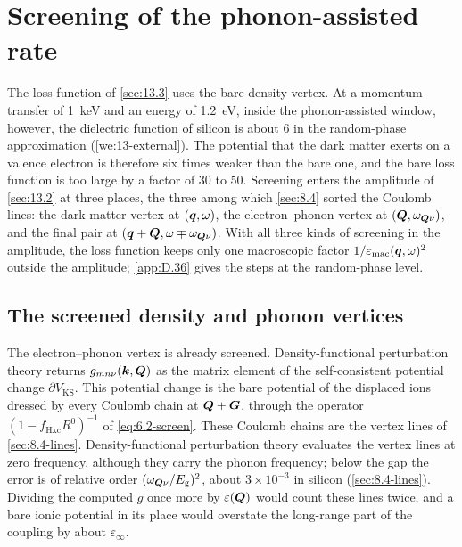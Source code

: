 \section{Screening of the phonon-assisted rate}\label{sec:13.4}

The loss function of \cref{sec:13.3} uses the bare density vertex. At a momentum transfer of \SI{1}{keV} and an energy of \SI{1.2}{eV}, inside the phonon-assisted window, however, the dielectric function of silicon is about 6 in the random-phase approximation (\cref{we:13-external}). The potential that the dark matter exerts on a valence electron is therefore six times weaker than the bare one, and the bare loss function is too large by a factor of 30 to 50. Screening enters the amplitude of \cref{sec:13.2} at three places, the three among which \cref{sec:8.4} sorted the Coulomb lines: the dark-matter vertex at $(\bm{q},\omega)$, the electron--phonon vertex at $(\bm{Q},\omega_{\bm{Q}\nu})$, and the final pair at $(\bm{q}+\bm{Q}, \omega \mp \omega_{\bm{Q}\nu})$. With all three kinds of screening in the amplitude, the loss function keeps only one macroscopic factor $1/\varepsilon_{\mathrm{mac}}(\bm{q},\omega)^2$ outside the amplitude; \cref{app:D.36} gives the steps at the random-phase level.

\subsection{The screened density and phonon vertices}

The electron--phonon vertex is already screened. Density-functional perturbation theory returns $g_{mn\nu}(\bm{k},\bm{Q})$ as the matrix element of the self-consistent potential change $\partial V_{\mathrm{KS}}$. This potential change is the bare potential of the displaced ions dressed by every Coulomb chain at $\bm{Q}+\bm{G}$, through the operator $(1 - f_{\mathrm{Hxc}}R^0)^{-1}$ of \cref{eq:6.2-screen}. These Coulomb chains are the vertex lines of \cref{sec:8.4-lines}. Density-functional perturbation theory evaluates the vertex lines at zero frequency, although they carry the phonon frequency; below the gap the error is of relative order $(\omega_{\bm{Q}\nu}/E_{\mathrm{g}})^2$, about $3\times10^{-3}$ in silicon (\cref{sec:8.4-lines}). Dividing the computed $g$ once more by $\varepsilon(\bm{Q})$ would count these lines twice, and a bare ionic potential in its place would overstate the long-range part of the coupling by about $\varepsilon_\infty$.

